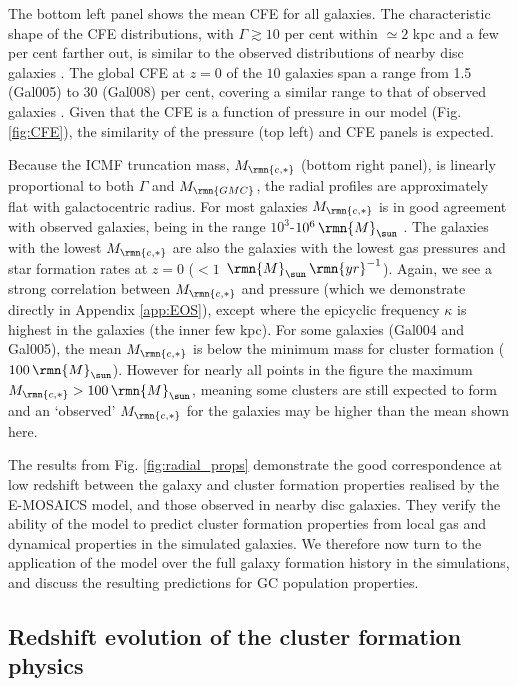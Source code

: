 \documentclass[fleqn,usenatbib]{mnras}
\newcommand\Msun{\,\rmn{M}_{\sun}}
\newcommand{\numgal}{10}
\newcommand{\Mcstar}{M_\rmn{c,\ast}}
\newcommand{\Mgmc}{M_\rmn{GMC}}
\begin{document}
The bottom left panel shows the mean CFE for all galaxies.
The characteristic shape of the CFE distributions, with $\Gamma \gtrsim 10$ per cent within $\simeq 2$ kpc and a few per cent farther out, is similar to the observed distributions of nearby disc galaxies \citep{Silva-Villa_et_al_13, Johnson_et_al_16}. The global CFE at $z=0$ of the $\numgal$ galaxies span a range from 1.5 (Gal005) to 30 (Gal008) per cent, covering a similar range to that of observed galaxies \citep[$\approx$1-50 per cent, shown as the grey shaded region; e.g.][]{Adamo_et_al_11,Adamo_et_al_15,Johnson_et_al_16}.
Given that the CFE is a function of pressure in our model (Fig. \ref{fig:CFE}), the similarity of the pressure (top left) and CFE panels is expected.

Because the ICMF truncation mass, $\Mcstar$ (bottom right panel), is linearly proportional to both $\Gamma$ and $\Mgmc$, the radial profiles are approximately flat with galactocentric radius. For most galaxies $\Mcstar$ is in good agreement with observed galaxies, being in the range $10^3$-$10^6 \Msun$ \citep[shown as the grey shaded region]{Johnson_et_al_17}. The galaxies with the lowest $\Mcstar$ are also the galaxies with the lowest gas pressures and star formation rates at $z=0$ ($<1$ $\Msun \, \rmn{yr}^{-1}$).
Again, we see a strong correlation between $\Mcstar$ and pressure (which we demonstrate directly in Appendix \ref{app:EOS}), except where the epicyclic frequency $\kappa$ is highest in the galaxies (the inner few kpc).
For some galaxies (Gal004 and Gal005), the mean $\Mcstar$ is below the minimum mass for cluster formation ($100 \Msun$). However for nearly all points in the figure the maximum $\Mcstar > 100 \Msun$, meaning some clusters are still expected to form and an `observed' $\Mcstar$ for the galaxies may be higher than the mean shown here. 

The results from Fig. \ref{fig:radial_props} demonstrate the good correspondence at low redshift between the galaxy and cluster formation properties realised by the E-MOSAICS model, and those observed in nearby disc galaxies. They verify the ability of the model to predict cluster formation properties from local gas and dynamical properties in the simulated galaxies. We therefore now turn to the application of the model over the full galaxy formation history in the simulations, and discuss the resulting predictions for GC population properties.

\subsection{Redshift evolution of the cluster formation physics}
\end{document}
